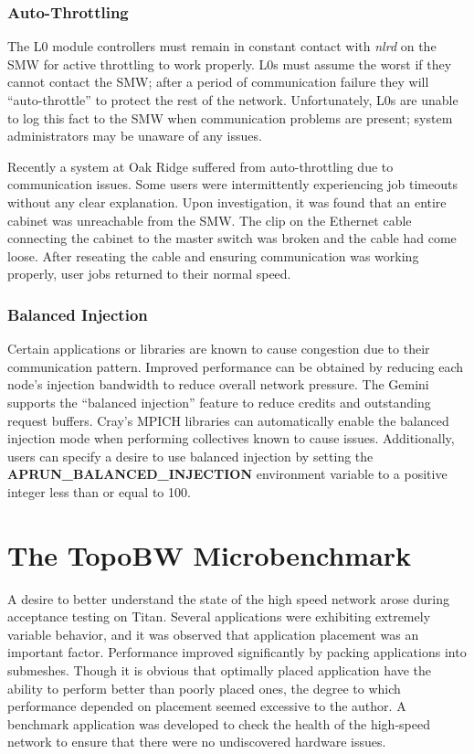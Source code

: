 \documentclass[10pt, conference, compsocconf]{IEEEtran}
\begin{document}
\subsubsection{Auto-Throttling}

The L0 module controllers must remain in constant contact with \emph{nlrd} on
the SMW for active throttling to work properly.  L0s must assume the worst if
they cannot contact the SMW; after a period of communication failure they will
``auto-throttle'' to protect the rest of the network.  Unfortunately, L0s are
unable to log this fact to the SMW when communication problems are present;
system administrators may be unaware of any issues.

Recently a system at Oak Ridge suffered from auto-throttling due to
communication issues.  Some users were intermittently experiencing job timeouts
without any clear explanation.  Upon investigation, it was found that an entire
cabinet was unreachable from the SMW.  The clip on the Ethernet cable
connecting the cabinet to the master switch was broken and the cable had come
loose.  After reseating the cable and ensuring communication was working
properly, user jobs returned to their normal speed.

\subsubsection{Balanced Injection}

\label{sec:bi}

Certain applications or libraries are known to cause congestion due to their
communication pattern.  Improved performance can be obtained by reducing each
node's injection bandwidth to reduce overall network pressure.  The Gemini
supports the ``balanced injection'' feature to reduce credits and outstanding
request buffers.  Cray's MPICH libraries can automatically enable the balanced
injection mode when performing collectives known to cause issues.
Additionally, users can specify a desire to use balanced injection by setting
the \textbf{APRUN\_BALANCED\_INJECTION} environment variable to a positive
integer less than or equal to 100.

\section{The TopoBW Microbenchmark}

A desire to better understand the state of the high speed network arose during
acceptance testing on Titan.  Several applications were exhibiting extremely
variable behavior, and it was observed that application placement was an
important factor.  Performance improved significantly by packing applications
into submeshes.  Though it is obvious that optimally placed application have
the ability to perform better than poorly placed ones, the degree to which
performance depended on placement seemed excessive to the author.  A benchmark
application was developed to check the health of the high-speed network to
ensure that there were no undiscovered hardware issues.
\end{document}
